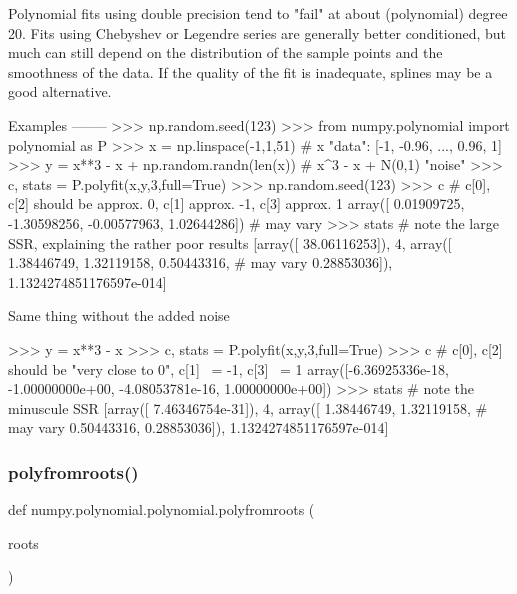\begin{DoxyVerb}
Polynomial fits using double precision tend to "fail" at about
(polynomial) degree 20. Fits using Chebyshev or Legendre series are
generally better conditioned, but much can still depend on the
distribution of the sample points and the smoothness of the data.  If
the quality of the fit is inadequate, splines may be a good
alternative.

Examples
--------
>>> np.random.seed(123)
>>> from numpy.polynomial import polynomial as P
>>> x = np.linspace(-1,1,51) # x "data": [-1, -0.96, ..., 0.96, 1]
>>> y = x**3 - x + np.random.randn(len(x)) # x^3 - x + N(0,1) "noise"
>>> c, stats = P.polyfit(x,y,3,full=True)
>>> np.random.seed(123)
>>> c # c[0], c[2] should be approx. 0, c[1] approx. -1, c[3] approx. 1
array([ 0.01909725, -1.30598256, -0.00577963,  1.02644286]) # may vary
>>> stats # note the large SSR, explaining the rather poor results
 [array([ 38.06116253]), 4, array([ 1.38446749,  1.32119158,  0.50443316, # may vary
          0.28853036]), 1.1324274851176597e-014]

Same thing without the added noise

>>> y = x**3 - x
>>> c, stats = P.polyfit(x,y,3,full=True)
>>> c # c[0], c[2] should be "very close to 0", c[1] ~= -1, c[3] ~= 1
array([-6.36925336e-18, -1.00000000e+00, -4.08053781e-16,  1.00000000e+00])
>>> stats # note the minuscule SSR
[array([  7.46346754e-31]), 4, array([ 1.38446749,  1.32119158, # may vary
           0.50443316,  0.28853036]), 1.1324274851176597e-014]\end{DoxyVerb}
 \mbox{\label{namespacenumpy_1_1polynomial_1_1polynomial_ac9af00aa52f5403bd83c41ba7f9fd0e2}} 
\subsubsection{\texorpdfstring{polyfromroots()}{polyfromroots()}}
{\footnotesize\ttfamily def numpy.\+polynomial.\+polynomial.\+polyfromroots (\begin{DoxyParamCaption}\item[{}]{roots }\end{DoxyParamCaption})}

